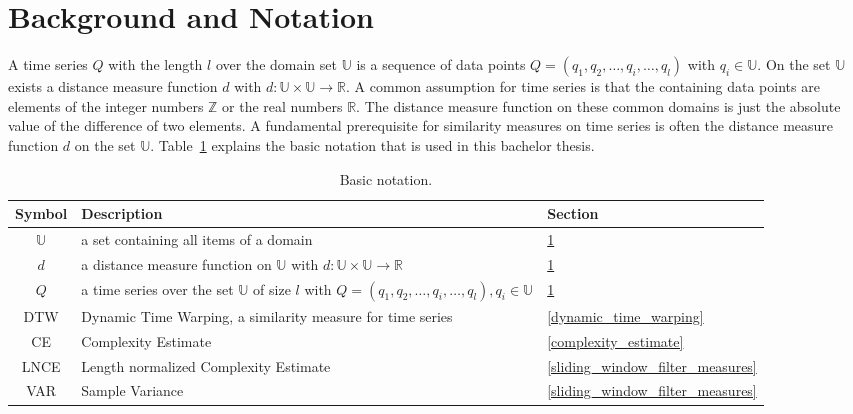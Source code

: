 \section{Background and Notation} \label{background_and_notation}
A time series $Q$ with the length $l$ over the domain set $\mathbb{U}$ is a sequence of data points
$Q = (q_1, q_2, \dots, q_i, \dots, q_l)$ with $q_i \in \mathbb{U}$. On the set $\mathbb{U}$ exists a distance measure
function $d$ with $d: \mathbb{U} \times \mathbb{U} \to \mathbb{R}$. A common assumption for time series is that the
containing data points are elements of the integer numbers $\mathbb{Z}$ or the real numbers $\mathbb{R}$. The distance
measure function on these common domains is just the absolute value of the difference of two elements. A fundamental
prerequisite for similarity measures on time series is often the distance measure function $d$ on the set
$\mathbb{U}$. Table~\ref{tab:notation} explains the basic notation that is used in this bachelor thesis.

\begin{table}
    \begin{center}
        \begin{tabularx}{\textwidth}{c X l}
            \textbf{Symbol} \qquad & \textbf{Description} & \qquad \textbf{Section}\\
            \hline
            $\mathbb{U}$ & a set containing all items of a domain & \qquad \ref{background_and_notation}\\
            $d$ & a distance measure function on $\mathbb{U}$ with $d: \mathbb{U} \times \mathbb{U} \to \mathbb{R}$
                & \qquad \ref{background_and_notation}\\
            $Q$ & a time series over the set $\mathbb{U}$ of size $l$ with
                $Q = (q_1, q_2, \dots, q_i, \dots, q_l), q_i \in \mathbb{U}$ & \qquad \ref{background_and_notation}\\
            DTW & Dynamic Time Warping, a similarity measure for time series & \qquad \ref{dynamic_time_warping}\\
            CE & Complexity Estimate & \qquad \ref{complexity_estimate}\\
            LNCE & Length normalized Complexity Estimate & \qquad \ref{sliding_window_filter_measures}\\
            VAR & Sample Variance & \qquad \ref{sliding_window_filter_measures}\\
        \end{tabularx}
    \end{center}
    \caption{Basic notation.}
	\label{tab:notation}
\end{table}




